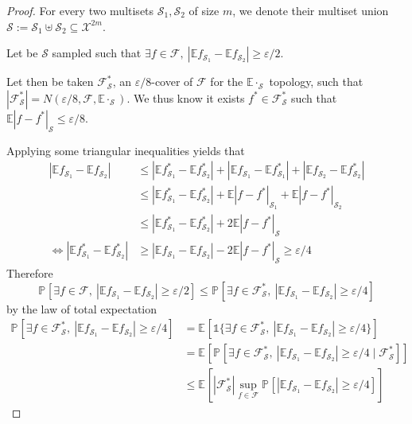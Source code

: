 \documentclass{article} %
\renewcommand{\epsilon}{\varepsilon}
\newcommand{\PPP}[2]{\mathbb{P}_{#1}\left[#2\right]}
\newcommand{\EE}{\mathbb{E}}
\newcommand{\EEE}[2]{\mathbb{E}_{#1}\left[#2\right]}
\newcommand{\1}{\mathds{1}} %
\theoremstyle{definition} %
\begin{document}
\begin{proof}
	For every two multisets $\mathcal{S}_1, \mathcal{S}_2$ of size $m$, we denote their multiset union $\mathcal{S} := \mathcal{S}_1 \uplus \mathcal{S}_2 \subseteq \mathcal{X}^{2m}$.

	Let be $\mathcal{S}$ sampled such that $\exists f \in \mathcal{F},\ |\EE {f_{\mathcal{S}_1}} - \EE {f_{\mathcal{S}_2}}| \geq \epsilon/2$. 
	
	Let then be taken $\mathcal{F^*_\mathcal{S}}$, an $\epsilon/8$-cover of $\mathcal{F}$ for the $\EE \cdot_{\mathcal{S}}$ topology, such that $|\mathcal{F^*_\mathcal{S}}| = N(\epsilon/8, \mathcal{F}, \EE \cdot_{\mathcal{S}})$. We thus know it exists $f^* \in \mathcal{F^*_\mathcal{S}}$ such that $\EE |f-f^*|_{\mathcal{S}} \leq \epsilon/8$.

	Applying some triangular inequalities yields that
	\begin{align*}
		|\EE{f_{\mathcal{S}_1}} - \EE{f_{\mathcal{S}_2}}| &\leq |\EE{f^*_{\mathcal{S}_1}} - \EE{f^*_{\mathcal{S}_2}}| + |\EE{f_{\mathcal{S}_1}} - \EE{f^*_{\mathcal{S}_1}}| + |\EE{f_{\mathcal{S}_2}} - \EE{f^*_{\mathcal{S}_2}}|  \\
		&\leq |\EE{f^*_{\mathcal{S}_1}} - \EE{f^*_{\mathcal{S}_2}}| + \EE|f-f^*|_{\mathcal{S}_1} + \EE|f-f^*|_{\mathcal{S}_2} \\
		&\leq |\EE{f^*_{\mathcal{S}_1}} - \EE{f^*_{\mathcal{S}_2}}| + 2  \EE|f-f^*|_{\mathcal{S}}\\
		\iff |\EE{f^*_{\mathcal{S}_1}} - \EE{f^*_{\mathcal{S}_2}}| &\geq |\EE{f_{\mathcal{S}_1}} - \EE{f_{\mathcal{S}_2}}| - 2  \EE|f-f^*|_{\mathcal{S}} \geq \epsilon/4 
	\end{align*}
	Therefore
	\begin{equation}
		\PPP{}{\exists f \in \mathcal{F},\ |\EE {f_{\mathcal{S}_1}} - \EE {f_{\mathcal{S}_2}}| \geq \epsilon/2} \leq \PPP{}{\exists f \in \mathcal{F^*_\mathcal{S}},\ |\EE {f_{\mathcal{S}_1}} - \EE {f_{\mathcal{S}_2}}| \geq \epsilon/4}
	\end{equation}
	by the law of total expectation
	\begin{align*}
		\PPP{}{\exists f \in \mathcal{F^*_\mathcal{S}},\ |\EE {f_{\mathcal{S}_1}} - \EE {f_{\mathcal{S}_2}}| \geq \epsilon/4}
		&=\EEE{}{ \1 \{\exists f \in \mathcal{F^*_\mathcal{S}},\ |\EE {f_{\mathcal{S}_1}} - \EE {f_{\mathcal{S}_2}}| \geq \epsilon/4 \} }\\
		&=\EEE{}{ \PPP{}{\exists f \in \mathcal{F^*_\mathcal{S}},\ |\EE {f_{\mathcal{S}_1}} - \EE {f_{\mathcal{S}_2}}| \geq \epsilon/4 \mid \mathcal{F^*_\mathcal{S}}}  }\\
		&\leq \EEE{}{|\mathcal{F^*_\mathcal{S}}| \sup_{f \in \mathcal{F}} \PPP{}{|\EE {f_{\mathcal{S}_1}} - \EE {f_{\mathcal{S}_2}}| \geq \epsilon/4 }}
	\end{align*}

\end{proof}
\end{document}
